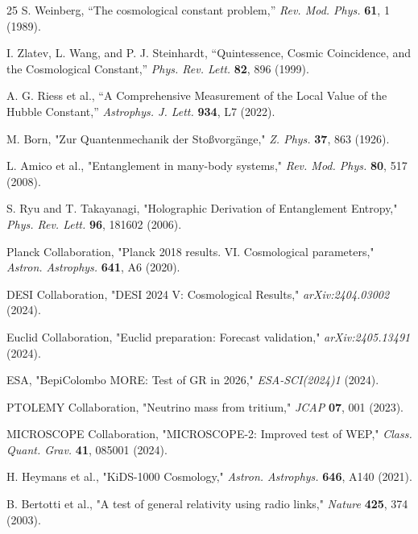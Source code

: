 \documentclass[12pt, a4paper]{article}
\theoremstyle{miuThm}
\theoremstyle{remark}
\begin{document}
\begin{thebibliography}{25}
S. Weinberg, ``The cosmological constant problem,'' \textit{Rev. Mod. Phys.} \textbf{61}, 1 (1989).

I. Zlatev, L. Wang, and P. J. Steinhardt, ``Quintessence, Cosmic Coincidence, and the Cosmological Constant,'' \textit{Phys. Rev. Lett.} \textbf{82}, 896 (1999).

A. G. Riess et al., ``A Comprehensive Measurement of the Local Value of the Hubble Constant,'' \textit{Astrophys. J. Lett.} \textbf{934}, L7 (2022).

M. Born, "Zur Quantenmechanik der Stoßvorgänge," \textit{Z. Phys.} \textbf{37}, 863 (1926).


L. Amico et al., "Entanglement in many-body systems," \textit{Rev. Mod. Phys.}
\textbf{80}, 517 (2008).

S. Ryu and T. Takayanagi, "Holographic Derivation of Entanglement Entropy,"
\textit{Phys. Rev. Lett.} \textbf{96}, 181602 (2006).

Planck Collaboration, "Planck 2018 results. VI. Cosmological parameters,"
\textit{Astron. Astrophys.} \textbf{641}, A6 (2020).

DESI Collaboration, "DESI 2024 V: Cosmological Results,"
\textit{arXiv:2404.03002} (2024).

Euclid Collaboration, "Euclid preparation: Forecast validation,"
\textit{arXiv:2405.13491} (2024).

ESA, "BepiColombo MORE: Test of GR in 2026," \textit{ESA-SCI(2024)1} (2024).

PTOLEMY Collaboration, "Neutrino mass from tritium," \textit{JCAP}
\textbf{07}, 001 (2023).

MICROSCOPE Collaboration, "MICROSCOPE-2: Improved test of WEP,"
\textit{Class. Quant. Grav.} \textbf{41}, 085001 (2024).

H. Heymans et al., "KiDS-1000 Cosmology," \textit{Astron. Astrophys.}
\textbf{646}, A140 (2021).

B. Bertotti et al., "A test of general relativity using radio links,"
\textit{Nature} \textbf{425}, 374 (2003).


\end{thebibliography}
\end{document}

